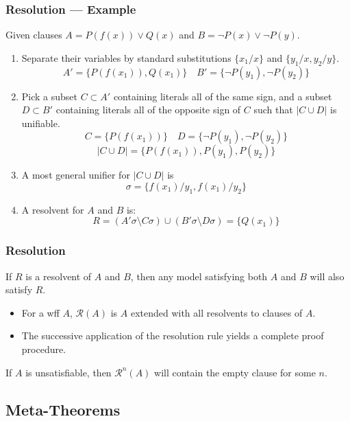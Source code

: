 \documentclass[UTF8,11pt,colorlinks,compress,openany]{beamer}%
\begin{document}
\begin{frame}\frametitle{Resolution --- Example}
Given clauses $A=P(f(x))\vee Q(x)$ and $B=\neg P(x)\vee\neg P(y)$.
\begin{enumerate}
\item Separate their variables by standard substitutions $\{x_1/x\}$ and $\{y_1/x,y_2/y\}$.
\[A'=\big\{P(f(x_1)), Q(x_1)\big\}\quad B'=\big\{\neg P(y_1), \neg P(y_2)\big\}\]
\item Pick a subset $C\subset A'$ containing literals all of the same sign, and a subset $D\subset B'$ containing literals all of the opposite sign of $C$ such that $|C\cup D|$ is unifiable.
\[C=\big\{P(f(x_1))\big\}\quad D=\big\{\neg P(y_1), \neg P(y_2)\big\}\]
\[|C\cup D|=\big\{P(f(x_1)), P(y_1), P(y_2)\big\}\]
\item A most general unifier for $|C\cup D|$ is
\[\sigma=\big\{f(x_1)/y_1,f(x_1)/y_2\big\}\]
\item A resolvent for $A$ and $B$ is:
\[R=(A'\sigma\setminus C\sigma)\cup(B'\sigma\setminus D\sigma)=\big\{Q(x_1)\big\}\]
\end{enumerate}
\end{frame}

\begin{frame}\frametitle{Resolution}
\begin{theorem}[Soundness]
If $R$ is a resolvent of $A$ and $B$, then any model satisfying both $A$ and $B$ will also satisfy $R$.
\end{theorem}
\begin{itemize}
\item For a wff $A$, $\mathcal{R}(A)$ is $A$ extended with all resolvents to clauses of $A$.
\item The successive application of the resolution rule yields a complete proof procedure.
\end{itemize}
\begin{theorem}[Completeness]
If $A$ is unsatisfiable, then $\mathcal{R}^n(A)$ will contain the empty clause for some $n$.
\end{theorem}
\end{frame}

\subsection{Meta-Theorems}
\end{document}

